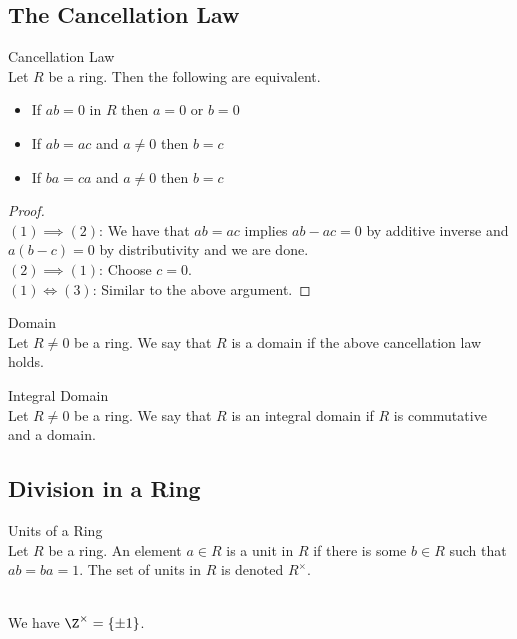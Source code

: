 \documentclass[a4paper]{article}
\begin{document}
\subsection{The Cancellation Law}
\begin{prp}{Cancellation Law}{}\\
Let $R$ be a ring. Then the following are equivalent. 
\begin{itemize}
\item If $ab=0$ in $R$ then $a=0$ or $b=0$
\item If $ab=ac$ and $a\neq 0$ then $b=c$
\item If $ba=ca$ and $a\neq 0$ then $b=c$
\end{itemize}
\begin{proof}\\
$(1)\implies(2)$: We have that $ab=ac$ implies $ab-ac=0$ by additive inverse and $a(b-c)=0$ by distributivity and we are done. \\

$(2)\implies(1)$: Choose $c=0$. \\

$(1)\iff(3)$: Similar to the above argument. 
\end{proof}
\end{prp}

\begin{defn}{Domain}{}\\
Let $R\neq 0$ be a ring. We say that $R$ is a domain if the above cancellation law holds. 
\end{defn}

\begin{defn}{Integral Domain}{}\\
Let $R\neq 0$ be a ring. We say that $R$ is an integral domain if $R$ is commutative and a domain. 
\end{defn}

\subsection{Division in a Ring}
\begin{defn}{Units of a Ring}{}\\
Let $R$ be a ring. An element $a\in R$ is a unit in $R$ if there is some $b\in R$ such that $ab=ba=1$. The set of units in $R$ is denoted $R^\times$. 
\end{defn}

\begin{eg}{}{}\\
We have $\Z^\times=\{\pm1\}$. 
\end{eg}
\end{document}
